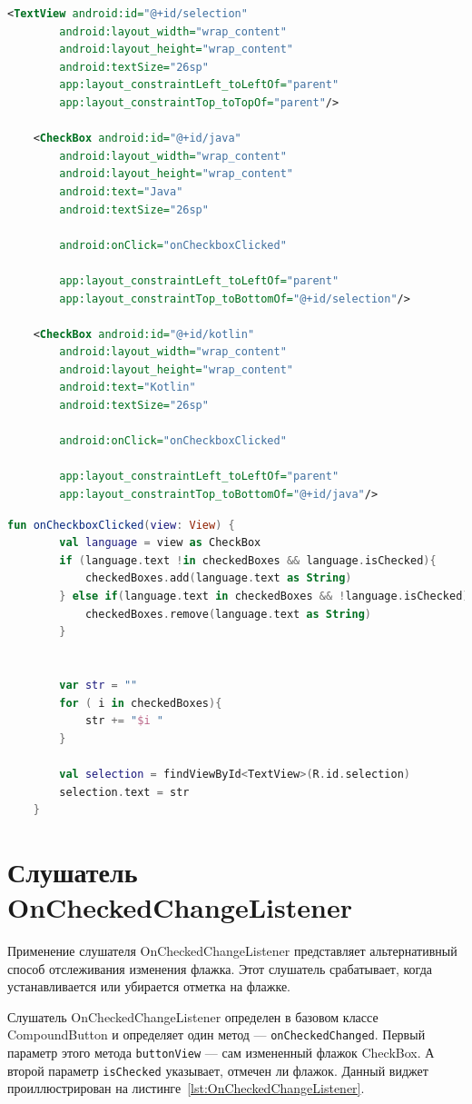 \begin{lstlisting}[language=xml, caption=\leftline{checkbox}, label=lst:checkbox]
<TextView android:id="@+id/selection"
        android:layout_width="wrap_content"
        android:layout_height="wrap_content"
        android:textSize="26sp"
        app:layout_constraintLeft_toLeftOf="parent"
        app:layout_constraintTop_toTopOf="parent"/>

    <CheckBox android:id="@+id/java"
        android:layout_width="wrap_content"
        android:layout_height="wrap_content"
        android:text="Java"
        android:textSize="26sp"

        android:onClick="onCheckboxClicked"

        app:layout_constraintLeft_toLeftOf="parent"
        app:layout_constraintTop_toBottomOf="@+id/selection"/>

    <CheckBox android:id="@+id/kotlin"
        android:layout_width="wrap_content"
        android:layout_height="wrap_content"
        android:text="Kotlin"
        android:textSize="26sp"

        android:onClick="onCheckboxClicked"

        app:layout_constraintLeft_toLeftOf="parent"
        app:layout_constraintTop_toBottomOf="@+id/java"/>
\end{lstlisting}

\begin{lstlisting}[language=Kotlin, caption=\leftline{checkbox Kotlin}, label=lst:checkboxKotlin]
fun onCheckboxClicked(view: View) {
        val language = view as CheckBox
        if (language.text !in checkedBoxes && language.isChecked){
            checkedBoxes.add(language.text as String)
        } else if(language.text in checkedBoxes && !language.isChecked) {
            checkedBoxes.remove(language.text as String)
        }


        var str = ""
        for ( i in checkedBoxes){
            str += "$i "
        }

        val selection = findViewById<TextView>(R.id.selection)
        selection.text = str
    }
\end{lstlisting}

\section{Слушатель OnCheckedChangeListener}
Применение слушателя OnCheckedChangeListener представляет
альтернативный способ отслеживания изменения флажка. Этот слушатель 
срабатывает, когда устанавливается или убирается отметка на флажке.\par
Слушатель OnCheckedChangeListener определен в базовом классе
CompoundButton и определяет один метод --- \texttt{onCheckedChanged}. Первый
параметр этого метода \texttt{buttonView} --- сам измененный флажок CheckBox.
А второй параметр \texttt{isChecked} указывает, отмечен ли флажок.
Данный виджет проиллюстрирован на листинге~\ref{lst:OnCheckedChangeListener}.

